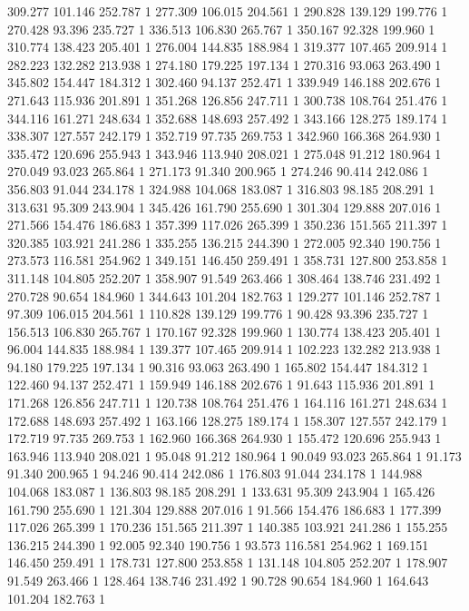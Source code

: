 	309.277	101.146	252.787	1
	277.309	106.015	204.561	1
	290.828	139.129	199.776	1
	270.428	93.396	235.727	1
	336.513	106.830	265.767	1
	350.167	92.328	199.960	1
	310.774	138.423	205.401	1
	276.004	144.835	188.984	1
	319.377	107.465	209.914	1
	282.223	132.282	213.938	1
	274.180	179.225	197.134	1
	270.316	93.063	263.490	1
	345.802	154.447	184.312	1
	302.460	94.137	252.471	1
	339.949	146.188	202.676	1
	271.643	115.936	201.891	1
	351.268	126.856	247.711	1
	300.738	108.764	251.476	1
	344.116	161.271	248.634	1
	352.688	148.693	257.492	1
	343.166	128.275	189.174	1
	338.307	127.557	242.179	1
	352.719	97.735	269.753	1
	342.960	166.368	264.930	1
	335.472	120.696	255.943	1
	343.946	113.940	208.021	1
	275.048	91.212	180.964	1
	270.049	93.023	265.864	1
	271.173	91.340	200.965	1
	274.246	90.414	242.086	1
	356.803	91.044	234.178	1
	324.988	104.068	183.087	1
	316.803	98.185	208.291	1
	313.631	95.309	243.904	1
	345.426	161.790	255.690	1
	301.304	129.888	207.016	1
	271.566	154.476	186.683	1
	357.399	117.026	265.399	1
	350.236	151.565	211.397	1
	320.385	103.921	241.286	1
	335.255	136.215	244.390	1
	272.005	92.340	190.756	1
	273.573	116.581	254.962	1
	349.151	146.450	259.491	1
	358.731	127.800	253.858	1
	311.148	104.805	252.207	1
	358.907	91.549	263.466	1
	308.464	138.746	231.492	1
	270.728	90.654	184.960	1
	344.643	101.204	182.763	1
	129.277	101.146	252.787	1
	97.309	106.015	204.561	1
	110.828	139.129	199.776	1
	90.428	93.396	235.727	1
	156.513	106.830	265.767	1
	170.167	92.328	199.960	1
	130.774	138.423	205.401	1
	96.004	144.835	188.984	1
	139.377	107.465	209.914	1
	102.223	132.282	213.938	1
	94.180	179.225	197.134	1
	90.316	93.063	263.490	1
	165.802	154.447	184.312	1
	122.460	94.137	252.471	1
	159.949	146.188	202.676	1
	91.643	115.936	201.891	1
	171.268	126.856	247.711	1
	120.738	108.764	251.476	1
	164.116	161.271	248.634	1
	172.688	148.693	257.492	1
	163.166	128.275	189.174	1
	158.307	127.557	242.179	1
	172.719	97.735	269.753	1
	162.960	166.368	264.930	1
	155.472	120.696	255.943	1
	163.946	113.940	208.021	1
	95.048	91.212	180.964	1
	90.049	93.023	265.864	1
	91.173	91.340	200.965	1
	94.246	90.414	242.086	1
	176.803	91.044	234.178	1
	144.988	104.068	183.087	1
	136.803	98.185	208.291	1
	133.631	95.309	243.904	1
	165.426	161.790	255.690	1
	121.304	129.888	207.016	1
	91.566	154.476	186.683	1
	177.399	117.026	265.399	1
	170.236	151.565	211.397	1
	140.385	103.921	241.286	1
	155.255	136.215	244.390	1
	92.005	92.340	190.756	1
	93.573	116.581	254.962	1
	169.151	146.450	259.491	1
	178.731	127.800	253.858	1
	131.148	104.805	252.207	1
	178.907	91.549	263.466	1
	128.464	138.746	231.492	1
	90.728	90.654	184.960	1
	164.643	101.204	182.763	1
